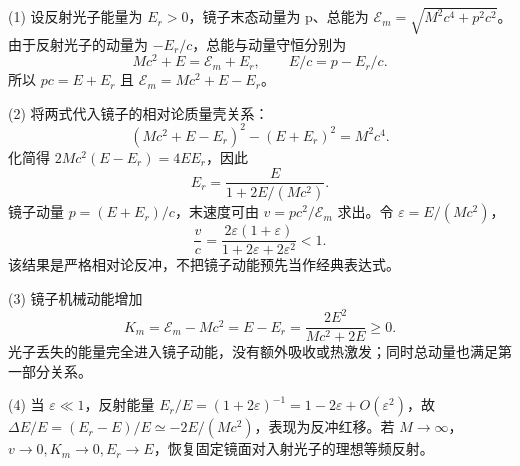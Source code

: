 (1) 设反射光子能量为 \(E_r>0\)，镜子末态动量为 p、总能为 \(\mathcal E_m=\sqrt{M^2c^4+p^2c^2}\)。由于反射光子的动量为 \(-E_r/c\)，总能与动量守恒分别为
\[
Mc^2+E=\mathcal E_m+E_r,\qquad
E/c=p-E_r/c.
\]
所以 \(pc=E+E_r\) 且 \(\mathcal E_m=Mc^2+E-E_r\)。

(2) 将两式代入镜子的相对论质量壳关系：
\[
(Mc^2+E-E_r)^2-(E+E_r)^2=M^2c^4.
\]
化简得 \(2Mc^2(E-E_r)=4EE_r\)，因此
\[
E_r=\frac{E}{1+2E/(Mc^2)}.
\]
镜子动量 \(p=(E+E_r)/c\)，末速度可由 \(v=pc^2/\mathcal E_m\) 求出。令 \(\varepsilon=E/(Mc^2)\)，
\[
\frac vc=\frac{2\varepsilon(1+\varepsilon)}{1+2\varepsilon+2\varepsilon^2}<1.
\]
该结果是严格相对论反冲，不把镜子动能预先当作经典表达式。

(3) 镜子机械动能增加
\[
K_m=\mathcal E_m-Mc^2=E-E_r
=\frac{2E^2}{Mc^2+2E}\ge0.
\]
光子丢失的能量完全进入镜子动能，没有额外吸收或热激发；同时总动量也满足第一部分关系。

(4) 当 \(\varepsilon\ll1\)，反射能量
\(E_r/E=(1+2\varepsilon)^{-1}=1-2\varepsilon+O(\varepsilon^2)\)，故 \(\Delta E/E=(E_r-E)/E\simeq-2E/(Mc^2)\)，表现为反冲红移。若 \(M\to \infty \)，\(v\to0,K_m\to0,E_r\to E\)，恢复固定镜面对入射光子的理想等频反射。
